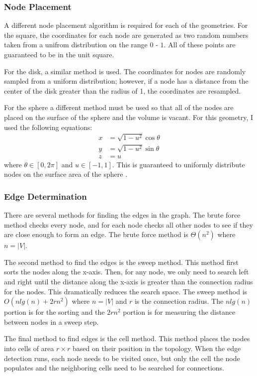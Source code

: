 \documentclass{article}
\begin{document}
        \subsubsection{Node Placement}
        A different node placement algorithm is required for each of the geometries. For the square, the coordinates for each node are generated as two random numbers taken from a unifrom distribution on the range $0$ - $1$. All of these points are guaranteed to be in the unit square.
        \par
        For the disk, a similar method is used. The coordinates for nodes are randomly sampled from a uniform distribution; however, if a node has a distance from the center of the disk greater than the radius of 1, the coordinates are resampled.
        \par
        For the sphere a different method must be used so that all of the nodes are placed on the surface of the sphere and the volume is vacant. For this geometry, I used the following equations:
        \begin{align}
            x &= \sqrt{1-u^2}\cos\theta \\
            y &= \sqrt{1-u^2}\sin\theta \\
            z &= u
        \end{align}
        where $\theta \in [0,2\pi]$ and $u \in [-1,1]$. This is guaranteed to uniformly distribute nodes on the surface area of the sphere \cite{spherepoints}.

        \subsubsection{Edge Determination}
        There are several methods for finding the edges in the graph. The brute force method checks every node, and for each node checks all other nodes to see if they are close enough to form an edge. The brute force method is $\Theta\left(n^2\right)$ where $n = |V|$.
        \par
        The second method to find the edges is the sweep method. This method first sorts the nodes along the x-axis. Then, for any node, we only need to search left and right until the distance along the x-axis is greater than the connection radius for the nodes. This dramatically reduces the search space. The sweep method is $O\left(n lg(n) + 2rn^2\right)$ where $n = |V|$ and $r$ is the connection radius. The $n lg(n)$ portion is for the sorting and the $2rn^2$ portion is for measuring the distance between nodes in a sweep step.
        \par
        The final method to find edges is the cell method. This method places the nodes into cells of area $r \times r$ based on their position in the topology. When the edge detection runs, each node needs to be visited once, but only the cell the node populates and the neighboring cells need to be searched for connections.
\end{document}
